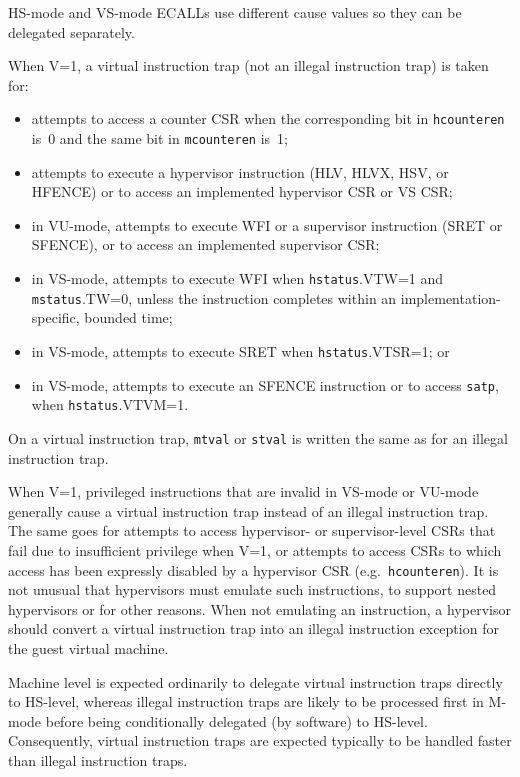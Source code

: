 \begin{commentary}
HS-mode and VS-mode ECALLs use different cause values so they can be delegated
separately.
\end{commentary}

When V=1, a virtual instruction trap (not an illegal instruction trap) is
taken for:
\begin{itemize}

\item
attempts to access a counter CSR when the corresponding bit in
{\tt hcounteren} is~0 and the same bit in {\tt mcounteren} is~1;

\item
attempts to execute a hypervisor instruction (HLV, HLVX, HSV, or HFENCE)
or to access an implemented hypervisor CSR or VS CSR;

\item
in VU-mode, attempts to execute WFI or a
supervisor instruction (SRET or SFENCE),
or to access an implemented supervisor CSR;

\item
in VS-mode, attempts to execute WFI when {\tt hstatus}.VTW=1 and
{\tt mstatus}.TW=0, unless the instruction completes within an
implementation-specific, bounded time;

\item
in VS-mode, attempts to execute SRET when {\tt hstatus}.VTSR=1; or

\item
in VS-mode, attempts to execute an SFENCE instruction or to access
{\tt satp}, when {\tt hstatus}.VTVM=1.

\end{itemize}

On a virtual instruction trap, {\tt mtval} or {\tt stval} is written the
same as for an illegal instruction trap.

\begin{commentary}
When V=1, privileged instructions that are invalid in VS-mode or
VU-mode generally cause a virtual instruction trap instead of an illegal
instruction trap.
The same goes for attempts to access hypervisor- or supervisor-level CSRs
that fail due to insufficient privilege when V=1, or attempts to access
CSRs to which access has been expressly disabled by a hypervisor CSR
(e.g.\ {\tt hcounteren}).
It is not unusual that hypervisors must emulate such instructions, to
support nested hypervisors or for other reasons.
When not emulating an instruction, a hypervisor should convert a virtual
instruction trap into an illegal instruction exception for the guest
virtual machine.

Machine level is expected ordinarily to delegate virtual instruction
traps directly to HS-level, whereas illegal instruction traps are likely
to be processed first in M-mode before being conditionally delegated (by
software) to HS-level.
Consequently, virtual instruction traps are expected typically to be
handled faster than illegal instruction traps.
\end{commentary}

